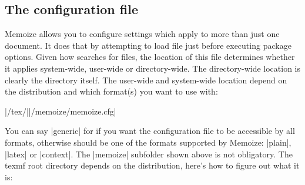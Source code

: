 \documentclass[a4paper,11pt]{article}
\begin{document}
\subsection{The configuration file}
\label{sec:memoize.cfg}

Memoize allows you to configure settings which apply to more than just one
document.  It does that by attempting to load file 
just before executing package options.  Given how  searches for
files, the location of this file determines whether it applies system-wide,
user-wide or directory-wide.  The directory-wide location is clearly the
directory itself.  The user-wide and system-wide location depend on the
 distribution and which format(s) you want to use
 with:

\begin{center}
  |/tex/||/memoize/memoize.cfg|
\end{center}

You can say |generic| for  if you want the configuration file to
be accessible by all formats, otherwise  should be one of the
formats supported by Memoize: |plain|, |latex| or |context|.  The |memoize|
subfolder shown above is not obligatory.  The texmf root directory depends on
the distribution, here's how to figure out what it is:
\end{document}
